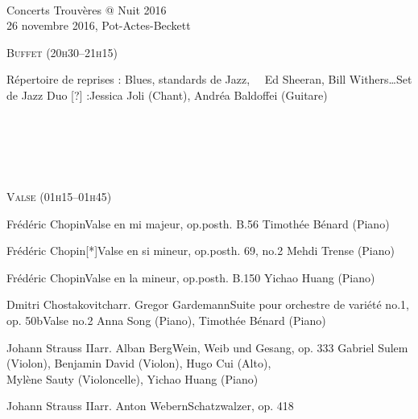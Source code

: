 \documentclass[a4paper,11pt,poets,durations]{ConcProg}
\begin{document}
{
\selectfont

~\\

\begin{programme}{
    Concerts Trouvères @ Nuit 2016
\\  {\normalsize 26 novembre 2016, Pot-Actes-Beckett}
}
~\\
\begin{center}
\textsc{Buffet (20h30--21h15)}
\end{center}
  \begin{part}[]
    \begin{composition}{Répertoire de reprises : Blues, standards de Jazz, ~~Ed Sheeran, Bill Withers\dots}{}{Set de Jazz}{}
      {\small Duo [?] :\newline Jessica Joli (Chant), Andréa Baldoffei (Guitare)}
    \end{composition}\\
~\\
~\\
~\\
\begin{center}
\textsc{Valse (01h15--01h45)}
\end{center}
    \begin{composition}{Frédéric Chopin}{}{Valse en mi majeur, op.posth. B.56}{}
      {\small Timothée Bénard (Piano)}
    \end{composition}
    \begin{composition}{Frédéric Chopin}{}{[*]Valse en si mineur, op.posth. 69, no.2}{}
      {\small Mehdi Trense (Piano)}
    \end{composition}
    \begin{composition}{Frédéric Chopin}{}{Valse en la mineur, op.posth. B.150}{}
      {\small Yichao Huang (Piano)}
    \end{composition}
    \begin{composition}{Dmitri Chostakovitch}{arr. Gregor Gardemann}{Suite pour orchestre de variété no.1, op. 50b}{Valse no.2}
      {\small Anna Song (Piano), Timothée Bénard (Piano)}
    \end{composition}
    \begin{composition}{Johann Strauss II}{arr. Alban Berg}{Wein, Weib und Gesang, op. 333}{}
      {\small Gabriel Sulem (Violon), Benjamin David (Violon), Hugo Cui (Alto),\\Mylène Sauty (Violoncelle), Yichao Huang (Piano)}
    \end{composition}
    \begin{composition}{Johann Strauss II}{arr. Anton Webern}{Schatzwalzer, op. 418}{}

\end{composition}
\end{part}
\end{programme}}
\end{document}
